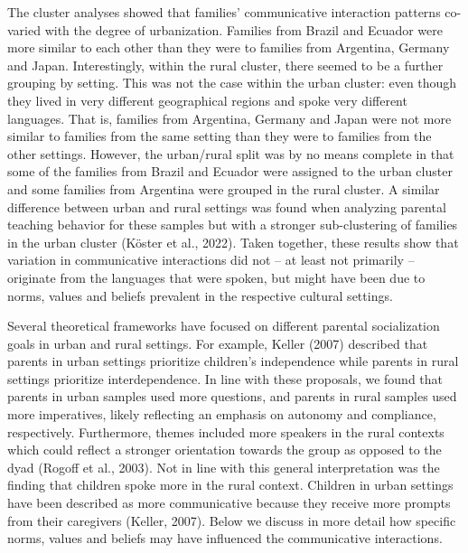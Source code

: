 \documentclass[
  man,floatsintext]{apa6}
\begin{document}
The cluster analyses showed that families' communicative interaction patterns co-varied with the degree of urbanization. Families from Brazil and Ecuador were more similar to each other than they were to families from Argentina, Germany and Japan. Interestingly, within the rural cluster, there seemed to be a further grouping by setting. This was not the case within the urban cluster: even though they lived in very different geographical regions and spoke very different languages. That is, families from Argentina, Germany and Japan were not more similar to families from the same setting than they were to families from the other settings. However, the urban/rural split was by no means complete in that some of the families from Brazil and Ecuador were assigned to the urban cluster and some families from Argentina were grouped in the rural cluster. A similar difference between urban and rural settings was found when analyzing parental teaching behavior for these samples but with a stronger sub-clustering of families in the urban cluster (Köster et al., 2022). Taken together, these results show that variation in communicative interactions did not -- at least not primarily -- originate from the languages that were spoken, but might have been due to norms, values and beliefs prevalent in the respective cultural settings.

Several theoretical frameworks have focused on different parental socialization goals in urban and rural settings. For example, Keller (2007) described that parents in urban settings prioritize children's independence while parents in rural settings prioritize interdependence. In line with these proposals, we found that parents in urban samples used more questions, and parents in rural samples used more imperatives, likely reflecting an emphasis on autonomy and compliance, respectively. Furthermore, themes included more speakers in the rural contexts which could reflect a stronger orientation towards the group as opposed to the dyad (Rogoff et al., 2003). Not in line with this general interpretation was the finding that children spoke more in the rural context. Children in urban settings have been described as more communicative because they receive more prompts from their caregivers (Keller, 2007). Below we discuss in more detail how specific norms, values and beliefs may have influenced the communicative interactions.
\end{document}
